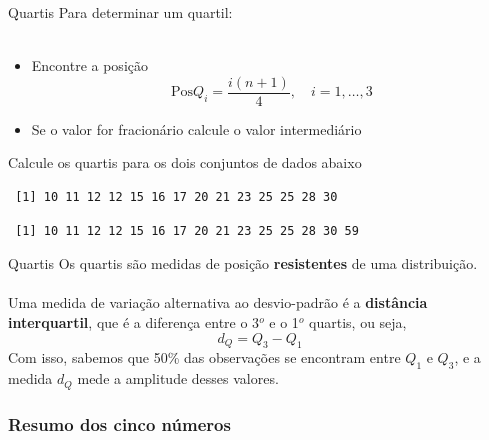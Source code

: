 \documentclass[10pt]{beamer}\usepackage[]{graphicx}\usepackage[]{color}
\makeatletter
\newenvironment{kframe}{%
 \def\at@end@of@kframe{}%
 \ifinner\ifhmode%
  \def\at@end@of@kframe{\end{minipage}}%
  \begin{minipage}{\columnwidth}%
 \fi\fi%
 \def\FrameCommand##1{\hskip\@totalleftmargin \hskip-\fboxsep
 \colorbox{shadecolor}{##1}\hskip-\fboxsep
     \hskip-\linewidth \hskip-\@totalleftmargin \hskip\columnwidth}%
 \MakeFramed {\advance\hsize-\width
   \@totalleftmargin\z@ \linewidth\hsize
   \@setminipage}}%
 {\par\unskip\endMakeFramed%
 \at@end@of@kframe}
\newenvironment{knitrout}{}{} %
\theoremstyle{definition}
\makeatother
\begin{document}
\begin{frame}[fragile]{Quartis}
  Para determinar um quartil: \\~\\
  \begin{itemize}
  \item Encontre a posição
    \begin{equation*}
      \text{Pos} Q_i = \frac{i(n+1)}{4}, \quad i=1,\ldots,3
    \end{equation*}
  \item Se o valor for fracionário calcule o valor intermediário
  \end{itemize}
  \vspace{1em}
  Calcule os quartis para os dois conjuntos de dados abaixo
\begin{knitrout}\footnotesize
{}\color{fgcolor}\begin{kframe}
\begin{verbatim}
 [1] 10 11 12 12 15 16 17 20 21 23 25 25 28 30
\end{verbatim}
\end{kframe}
\end{knitrout}
\begin{knitrout}\footnotesize
{}\color{fgcolor}\begin{kframe}
\begin{verbatim}
 [1] 10 11 12 12 15 16 17 20 21 23 25 25 28 30 59
\end{verbatim}
\end{kframe}
\end{knitrout}

\end{frame}

\begin{frame}{Quartis}
  Os quartis são medidas de posição \textbf{resistentes} de
  uma distribuição. \\~\\
  Uma medida de variação alternativa ao desvio-padrão é a
  \textbf{distância interquartil}, que é a diferença entre o 3$^o$ e o
  1$^o$ quartis, ou seja,
  \begin{equation*}
    d_Q = Q_3 - Q_1
  \end{equation*}
  Com isso, sabemos que 50\% das observações se encontram entre
  $Q_1$ e $Q_3$, e a medida $d_Q$ mede a amplitude desses valores.
\end{frame}

\subsubsection[Resumo dos 5 números]{Resumo dos cinco números}
\end{document}
